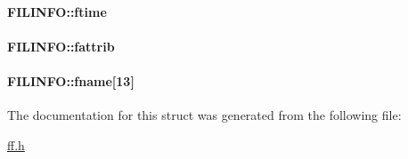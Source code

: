 \paragraph[{ftime}]{ F\+I\+L\+I\+N\+F\+O\+::ftime}\label{struct_f_i_l_i_n_f_o_ae0f751b79621bf7b29669f177bbe6b9a}
\paragraph[{fattrib}]{ F\+I\+L\+I\+N\+F\+O\+::fattrib}\label{struct_f_i_l_i_n_f_o_a838d542585831b085537b363f18205c0}
\paragraph[{fname}]{ F\+I\+L\+I\+N\+F\+O\+::fname\mbox{[}13\mbox{]}}\label{struct_f_i_l_i_n_f_o_abd852510f2f79b4ec773156d8942dc7c}


The documentation for this struct was generated from the following file\+:\begin{DoxyCompactItemize}
\item 
\hyperlink{ff_8h}{ff.\+h}\end{DoxyCompactItemize}
